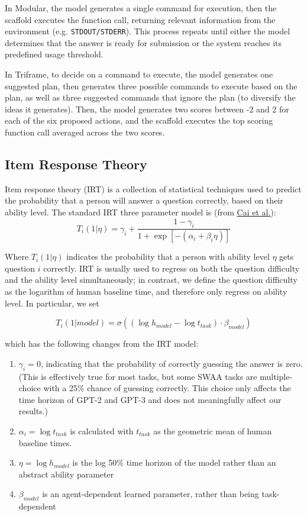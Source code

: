 \documentclass{article}
\begin{document}
In Modular, the model generates a single command for execution, then the scaffold executes the function call, returning relevant information from the environment (e.g. \texttt{STDOUT/STDERR}). This process repeats  until either the model determines that the answer is ready for submission or the system reaches its predefined usage threshold.

In Triframe, to decide on a command to execute, the model generates one suggested plan, then generates three possible commands to execute based on the plan, as well as three suggested commands that ignore the plan (to diversify the ideas it generates). Then, the model generates two scores between -2 and 2 for each of the six proposed actions, and the scaffold executes the top scoring function call averaged across the two scores.

\subsection{Item Response Theory} \label{app:irt}

Item response theory (IRT) is a collection of statistical techniques used to predict the probability that a person will answer a question correctly, based on their ability level. The standard IRT three parameter model is (from \href{https://files.eric.ed.gov/fulltext/ED600182.pdf}{Cai et al.}):
\[
T_i(1|\eta)=\gamma_i+\frac{1-\gamma_i}{1+\exp[- (\alpha_i + \beta_i\eta)]}
\]

Where $T_i(1|\eta)$ indicates the probability that a person with ability level $\eta$ gets question $i$ correctly.
IRT is usually used to regress on both the question difficulty and the ability level simultaneously; in contrast, we define the question difficulty as the logarithm of human baseline time, and therefore only regress on ability level. In particular, we set

\[
T_i(1|model) = \sigma((\log h_{model} - \log t_{task}) \cdot \beta_{model})
\]

which has the following changes from the IRT model:

\begin{enumerate}
\item $\gamma_i = 0$, indicating that the probability of correctly guessing the answer is zero. (This is effectively true for most tasks, but some SWAA tasks are multiple-choice with a 25\% chance of guessing correctly. This choice only affects the time horizon of GPT-2 and GPT-3 and does not meaningfully affect our results.)
\item $\alpha_{i} = \log t_{task}$ is calculated with $t_{task}$ as the geometric mean of human baseline times.
\item $\eta = \log h_{model}$ is the log 50\% time horizon of the model rather than an abstract ability parameter
\item $\beta_{model}$ is an agent-dependent learned parameter, rather than being task-dependent
\end{enumerate}
\end{document}
